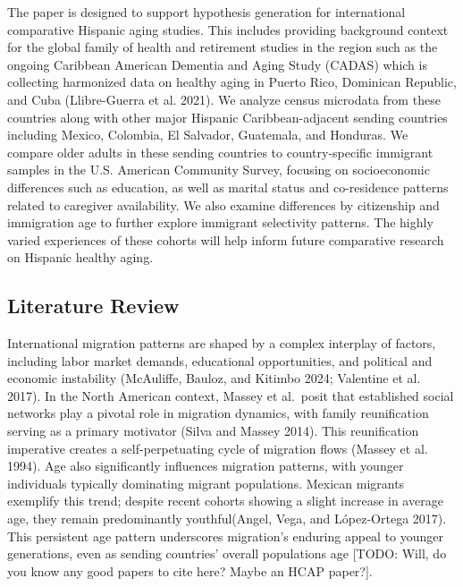 \documentclass[
]{article}
\begin{document}
The paper is designed to support hypothesis generation for international
comparative Hispanic aging studies. This includes providing background
context for the global family of health and retirement studies in the
region such as the ongoing Caribbean American Dementia and Aging Study
(CADAS) which is collecting harmonized data on healthy aging in Puerto
Rico, Dominican Republic, and Cuba (Llibre-Guerra et al. 2021). We
analyze census microdata from these countries along with other major
Hispanic Caribbean-adjacent sending countries including Mexico,
Colombia, El Salvador, Guatemala, and Honduras. We compare older adults
in these sending countries to country-specific immigrant samples in the
U.S. American Community Survey, focusing on socioeconomic differences
such as education, as well as marital status and co-residence patterns
related to caregiver availability. We also examine differences by
citizenship and immigration age to further explore immigrant selectivity
patterns. The highly varied experiences of these cohorts will help
inform future comparative research on Hispanic healthy aging.

\subsection{Literature Review}\label{sec-lit}

International migration patterns are shaped by a complex interplay of
factors, including labor market demands, educational opportunities, and
political and economic instability (McAuliffe, Bauloz, and Kitimbo 2024;
Valentine et al. 2017). In the North American context, Massey et
al.~posit that established social networks play a pivotal role in
migration dynamics, with family reunification serving as a primary
motivator (Silva and Massey 2014). This reunification imperative creates
a self-perpetuating cycle of migration flows (Massey et al. 1994). Age
also significantly influences migration patterns, with younger
individuals typically dominating migrant populations. Mexican migrants
exemplify this trend; despite recent cohorts showing a slight increase
in average age, they remain predominantly youthful(Angel, Vega, and
López-Ortega 2017). This persistent age pattern underscores migration's
enduring appeal to younger generations, even as sending countries'
overall populations age {[}TODO: Will, do you know any good papers to
cite here? Maybe an HCAP paper?{]}.
\end{document}
